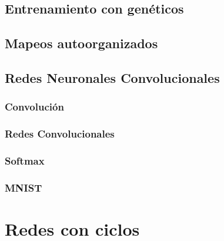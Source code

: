 \documentclass[12pt,openany]{book}
\begin{document}
\chapter{Entrenamiento con genéticos}






\chapter{Mapeos autoorganizados}





\chapter{Redes Neuronales Convolucionales}
\section{Convolución}
\section{Redes Convolucionales}
\section{Softmax}
\section{MNIST}

\part{Redes con ciclos}
\end{document}
